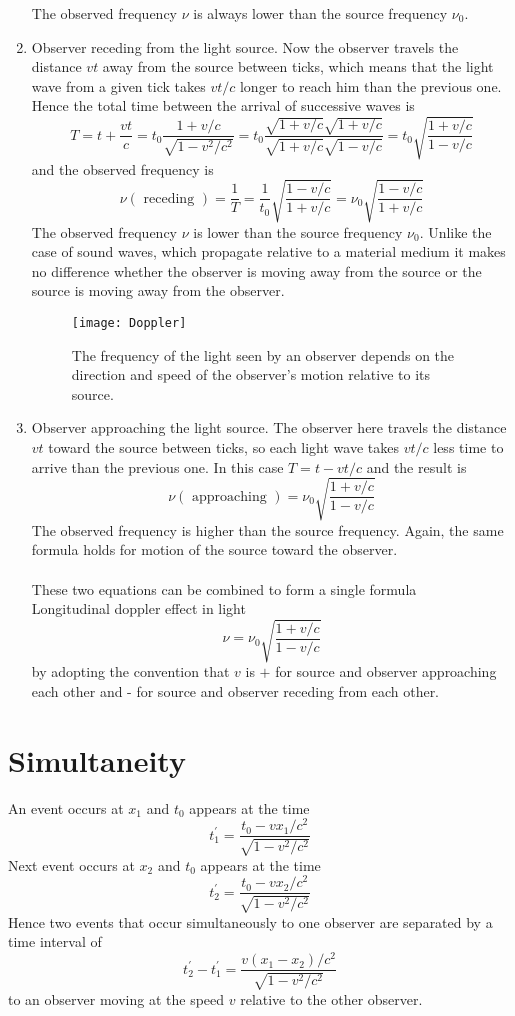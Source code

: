 \begin{enumerate}
	The observed frequency $\nu$ is always lower than the source frequency $\nu_{0}$.\\
	\item  Observer receding from the light source. Now the observer travels the distance $v t$ away from the source between ticks, which means that the light wave from a given tick takes $v t / c$ longer to reach him than the previous one. Hence the total time between the arrival of successive waves is
	$$
	T=t+\frac{v t}{c}=t_{0} \frac{1+v / c}{\sqrt{1-v^{2} / c^{2}}}=t_{0} \frac{\sqrt{1+v / c} \sqrt{1+v / c}}{\sqrt{1+v / c} \sqrt{1-v / c}}=t_{0} \sqrt{\frac{1+v / c}{1-v / c}}
	$$
	and the observed frequency is
	$$
	\nu(\text { receding })=\frac{1}{T}=\frac{1}{t_{0}} \sqrt{\frac{1-v / c}{1+v / c}}=\nu_{0} \sqrt{\frac{1-v / c}{1+v / c}}
	$$
	The observed frequency $\nu$ is lower than the source frequency $\nu_{0}$. Unlike the case of sound waves, which propagate relative to a material medium it makes no difference whether the observer is moving away from the source or the source is moving away from the observer.
	\begin{figure}[H]
		\centering
		\texttt{[image: Doppler]}
		\caption{ The frequency of the light seen by an observer depends on the direction and speed of the observer's motion relative to its source.}
		\label{}
	\end{figure}
	\item  Observer approaching the light source. The observer here travels the distance $v t$ toward the source between ticks, so each light wave takes $v t / c$ less time to arrive than the previous one. In this case $T=t-v t / c$ and the result is
	$$
	\nu(\text { approaching })=\nu_{0} \sqrt{\frac{1+v / c}{1-v / c}}
	$$
	The observed frequency is higher than the source frequency. Again, the same formula holds for motion of the source toward the observer.\\\\
	These two equations can be combined to form a single formula\\
	Longitudinal doppler
	effect in light
	$$
	\nu=\nu_{0} \sqrt{\frac{1+v / c}{1-v / c}}
	$$
	by adopting the convention that $v$ is $+$ for source and observer approaching each other and - for source and observer receding from each other.
\end{enumerate}
\section{ Simultaneity}
An event occurs at $x_{1}$ and $t_{0}$ appears at the time \\
$$
t_{1}^{\prime}=\frac{t_{0}-v x_{1} / c^{2}}{\sqrt{1-v^{2} / c^{2}}}
$$
Next event occurs at  $x_{2}$ and $t_{0}$ appears at the time
$$
t_{2}^{\prime}=\frac{t_{0}-v x_{2} / c^{2}}{\sqrt{1-v^{2} / c^{2}}}
$$
Hence two events that occur simultaneously to one observer are separated by a time interval of\\
$$
t_{2}^{\prime}-t_{1}^{\prime}=\frac{v\left(x_{1}-x_{2}\right) / c^{2}}{\sqrt{1-v^{2} / c^{2}}}
$$
to an observer moving at the speed $v$ relative to the other observer.
